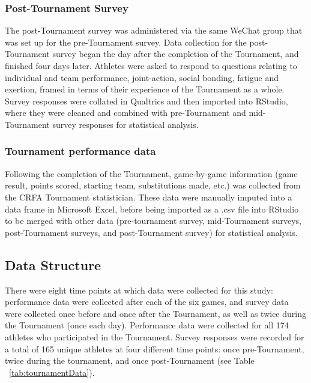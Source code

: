         \subsubsection{Post-Tournament Survey}

The post-Tournament survey was administered via the same WeChat group that was set up for the pre-Tournament survey. Data collection for the post-Tournament survey began the day after the completion of the Tournament, and finished four days later. Athletes were asked to respond to questions relating to individual and team performance, joint-action, social bonding, fatigue and exertion, framed in terms of their experience of the Tournament as a whole. Survey responses were collated in Qualtrics and then imported into RStudio, where they were cleaned and combined with pre-Tournament and mid-Tournament survey responses for statistical analysis.


        \subsubsection{Tournament performance data}
Following the completion of the Tournament, game-by-game information (game result, points scored, starting team, substitutions made, etc.) was collected from the CRFA Tournament statistician. These data were manually imputed into a data frame in Microsoft Excel, before being imported as a .csv file into RStudio to be merged with other data (pre-tournament survey, mid-Tournament surveys, post-Tournament surveys, and post-Tournament survey) for statistical analysis.




\subsection{Data Structure}
There were eight time points at which data were collected for this study: performance data were collected after each of the six games, and survey data were collected once before and once after the Tournament, as well as twice during the Tournament (once each day). Performance data were collected for all 174 athletes who participated in the Tournament. Survey responses were recorded for a total of 165 unique athletes at four different time points: once pre-Tournament, twice during the tournament, and once post-Tournament (see Table ~\ref{tab:tournamentData}).

